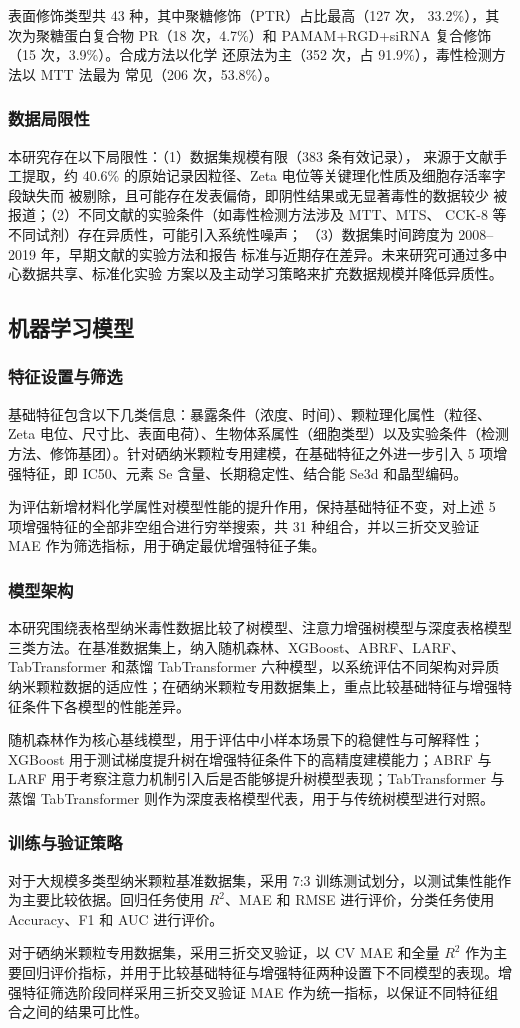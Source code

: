 表面修饰类型共 43 种，其中聚糖修饰（PTR）占比最高（127 次，
33.2\%），其次为聚糖蛋白复合物 PR（18 次，4.7\%）和
PAMAM+RGD+siRNA 复合修饰（15 次，3.9\%）。合成方法以化学
还原法为主（352 次，占 91.9\%），毒性检测方法以 MTT 法最为
常见（206 次，53.8\%）。

\subsubsection{数据局限性}
本研究存在以下局限性：（1）数据集规模有限（383 条有效记录），
来源于文献手工提取，约 40.6\% 的原始记录因粒径、Zeta 电位等关键理化性质及细胞存活率字段缺失而
被剔除，且可能存在发表偏倚，即阴性结果或无显著毒性的数据较少
被报道；（2）不同文献的实验条件（如毒性检测方法涉及 MTT、MTS、
CCK-8 等不同试剂）存在异质性，可能引入系统性噪声；
（3）数据集时间跨度为 2008--2019 年，早期文献的实验方法和报告
标准与近期存在差异。未来研究可通过多中心数据共享、标准化实验
方案以及主动学习策略来扩充数据规模并降低异质性。

\subsection{机器学习模型}

\subsubsection{特征设置与筛选}
基础特征包含以下几类信息：暴露条件（浓度、时间）、颗粒理化属性（粒径、Zeta 电位、尺寸比、表面电荷）、生物体系属性（细胞类型）以及实验条件（检测方法、修饰基团）。针对硒纳米颗粒专用建模，在基础特征之外进一步引入 5 项增强特征，即 IC50、元素 Se 含量、长期稳定性、结合能 Se3d 和晶型编码。

为评估新增材料化学属性对模型性能的提升作用，保持基础特征不变，对上述 5 项增强特征的全部非空组合进行穷举搜索，共 31 种组合，并以三折交叉验证 MAE 作为筛选指标，用于确定最优增强特征子集。

\subsubsection{模型架构}
本研究围绕表格型纳米毒性数据比较了树模型、注意力增强树模型与深度表格模型三类方法。在基准数据集上，纳入随机森林、XGBoost、ABRF、LARF、TabTransformer 和蒸馏 TabTransformer 六种模型，以系统评估不同架构对异质纳米颗粒数据的适应性；在硒纳米颗粒专用数据集上，重点比较基础特征与增强特征条件下各模型的性能差异。

随机森林作为核心基线模型，用于评估中小样本场景下的稳健性与可解释性；XGBoost 用于测试梯度提升树在增强特征条件下的高精度建模能力；ABRF 与 LARF 用于考察注意力机制引入后是否能够提升树模型表现；TabTransformer 与蒸馏 TabTransformer 则作为深度表格模型代表，用于与传统树模型进行对照。

\subsubsection{训练与验证策略}
对于大规模多类型纳米颗粒基准数据集，采用 7:3 训练测试划分，以测试集性能作为主要比较依据。回归任务使用 $R^2$、MAE 和 RMSE 进行评价，分类任务使用 Accuracy、F1 和 AUC 进行评价。

对于硒纳米颗粒专用数据集，采用三折交叉验证，以 CV MAE 和全量 $R^2$ 作为主要回归评价指标，并用于比较基础特征与增强特征两种设置下不同模型的表现。增强特征筛选阶段同样采用三折交叉验证 MAE 作为统一指标，以保证不同特征组合之间的结果可比性。
